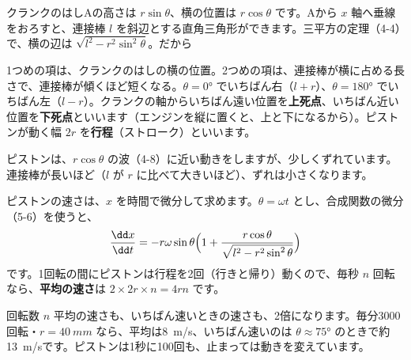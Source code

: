 クランクのはしAの高さは $r\sin\theta$、横の位置は $r\cos\theta$ です。Aから $x$ 軸へ垂線をおろすと、連接棒 $l$ を斜辺とする直角三角形ができます。三平方の定理（4-4）で、横の辺は $\sqrt{l^2-r^2\sin^2\theta}$。だから
\begin{phyomi}[ピストンの位置]
1つめの項は、クランクのはしの横の位置。2つめの項は、連接棒が横に占める長さで、連接棒が傾くほど短くなる。$\theta=\ang{0}$ でいちばん右（$l+r$）、$\theta=\ang{180}$ でいちばん左（$l-r$）。クランクの軸からいちばん遠い位置を\textbf{上死点}、いちばん近い位置を\textbf{下死点}といいます（エンジンを縦に置くと、上と下になるから）。ピストンが動く幅 $2r$ を\textbf{行程}（ストローク）といいます。
\end{phyomi}
\begin{bkcenter}
\end{bkcenter}
ピストンは、$r\cos\theta$ の波（4-8）に近い動きをしますが、少しくずれています。連接棒が長いほど（$l$ が $r$ に比べて大きいほど）、ずれは小さくなります。

ピストンの速さは、$x$ を時間で微分して求めます。$\theta=\omega t$ とし、合成関数の微分（5-6）を使うと、
\[\frac{\dd x}{\dd t}=-r\omega\sin\theta\Bigl(1+\frac{r\cos\theta}{\sqrt{l^2-r^2\sin^2\theta}}\Bigr)\]
です。1回転の間にピストンは行程を2回（行きと帰り）動くので、毎秒 $n$ 回転なら、\textbf{平均の速さ}は $2\times2r\times n=4rn$ です。
\begin{phbaisuru}{回転数 $n$}
平均の速さも、いちばん速いときの速さも、2倍になります。毎分3000回転・$r=\qty{40}{mm}$ なら、平均は\qty{8}{m/s}、いちばん速いのは $\theta\approx\ang{75}$ のときで約\qty{13}{m/s}です。ピストンは1秒に100回も、止まっては動きを変えています。
\end{phbaisuru}

